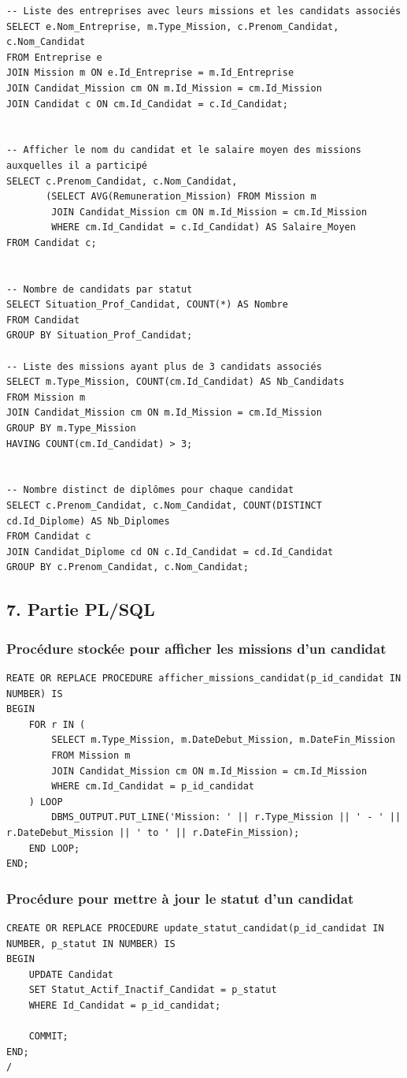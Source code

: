 \documentclass[a4paper,12pt]{article}
\begin{document}
\begin{verbatim}
-- Liste des entreprises avec leurs missions et les candidats associés
SELECT e.Nom_Entreprise, m.Type_Mission, c.Prenom_Candidat, c.Nom_Candidat
FROM Entreprise e
JOIN Mission m ON e.Id_Entreprise = m.Id_Entreprise
JOIN Candidat_Mission cm ON m.Id_Mission = cm.Id_Mission
JOIN Candidat c ON cm.Id_Candidat = c.Id_Candidat;


-- Afficher le nom du candidat et le salaire moyen des missions auxquelles il a participé
SELECT c.Prenom_Candidat, c.Nom_Candidat,
       (SELECT AVG(Remuneration_Mission) FROM Mission m
        JOIN Candidat_Mission cm ON m.Id_Mission = cm.Id_Mission
        WHERE cm.Id_Candidat = c.Id_Candidat) AS Salaire_Moyen
FROM Candidat c;


-- Nombre de candidats par statut
SELECT Situation_Prof_Candidat, COUNT(*) AS Nombre
FROM Candidat
GROUP BY Situation_Prof_Candidat;

-- Liste des missions ayant plus de 3 candidats associés
SELECT m.Type_Mission, COUNT(cm.Id_Candidat) AS Nb_Candidats
FROM Mission m
JOIN Candidat_Mission cm ON m.Id_Mission = cm.Id_Mission
GROUP BY m.Type_Mission
HAVING COUNT(cm.Id_Candidat) > 3;


-- Nombre distinct de diplômes pour chaque candidat
SELECT c.Prenom_Candidat, c.Nom_Candidat, COUNT(DISTINCT cd.Id_Diplome) AS Nb_Diplomes
FROM Candidat c
JOIN Candidat_Diplome cd ON c.Id_Candidat = cd.Id_Candidat
GROUP BY c.Prenom_Candidat, c.Nom_Candidat;
\end{verbatim}
\subsection*{7.  Partie PL/SQL }
\subsubsection*{Procédure stockée pour afficher les missions d’un candidat}
\begin{verbatim}
REATE OR REPLACE PROCEDURE afficher_missions_candidat(p_id_candidat IN NUMBER) IS
BEGIN
    FOR r IN (
        SELECT m.Type_Mission, m.DateDebut_Mission, m.DateFin_Mission
        FROM Mission m
        JOIN Candidat_Mission cm ON m.Id_Mission = cm.Id_Mission
        WHERE cm.Id_Candidat = p_id_candidat
    ) LOOP
        DBMS_OUTPUT.PUT_LINE('Mission: ' || r.Type_Mission || ' - ' || r.DateDebut_Mission || ' to ' || r.DateFin_Mission);
    END LOOP;
END;
\end{verbatim}
\subsubsection*{Procédure pour mettre à jour le statut d’un candidat}
\begin{verbatim}
CREATE OR REPLACE PROCEDURE update_statut_candidat(p_id_candidat IN NUMBER, p_statut IN NUMBER) IS
BEGIN
    UPDATE Candidat
    SET Statut_Actif_Inactif_Candidat = p_statut
    WHERE Id_Candidat = p_id_candidat;
    
    COMMIT;
END;
/
\end{verbatim}
\end{document}

